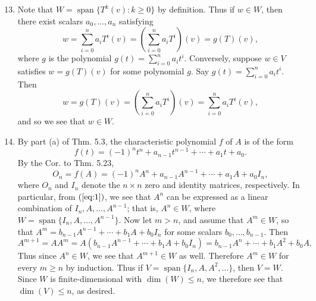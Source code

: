\documentclass[12pt]{article}
\DeclareMathOperator{\spn}{span}
\begin{document}
\begin{enumerate}
\setcounter{enumi}{12}
\item
Note that $W = \spn\{T^k(v) : k \geq 0\}$ by definition. Thus if $w \in W$, then there exist scalars $a_0, \dots, a_n$ satisfying
\begin{equation*}
w = \sum_{i=0}^n a_i T^i(v) = \left(\sum_{i=0}^n a_i T^i \right)(v) = g(T)(v),
\end{equation*}
where $g$ is the polynomial $g(t) = \sum_{i=0}^n a_i t^i$. Conversely, suppose $w \in V$ satisfies $w = g(T)(v)$ for some polynomial $g$. Say $g(t) = \sum_{i=0}^n a_i t^i$. Then
\begin{equation*}
w = g(T)(v) = \left(\sum_{i=0}^n a_i T^i \right)(v) = \sum_{i=0}^n a_i T^i(v),
\end{equation*}
and so we see that $w \in W$.

\setcounter{enumi}{16}
\item
By part (a) of Thm. 5.3, the characteristic polynomial $f$ of $A$ is of the form
\begin{equation*}
f(t) = (-1)^n t^n + a_{n-1} t^{n-1} + \cdots + a_1 t + a_0.
\end{equation*}
By the Cor. to Thm. 5.23,
\begin{equation} \label{eq:1}
O_n = f(A) = (-1)^n A^n + a_{n-1} A^{n-1} + \cdots + a_1 A + a_0 I_n,
\end{equation}
where $O_n$ and $I_n$ denote the $n \times n$ zero and identity matrices, respectively. In particular, from $(\ref{eq:1})$, we see that $A^n$ can be expressed as a linear combination of $I_n, A, \dots, A^{n-1}$; that is, $A^n \in W$, where $W = \spn\{I_n, A, \dots, A^{n-1}\}$. Now let $m > n$, and assume that $A^m \in W$, so that $A^m = b_{n-1}A^{n-1} + \cdots + b_1 A + b_0 I_n$ for some scalars $b_0, \dots, b_{n-1}$. Then
\begin{equation*}
A^{m+1} = A A^m = A(b_{n-1}A^{n-1} + \cdots + b_1 A + b_0 I_n) = b_{n-1}A^{n} + \cdots + b_1 A^2 + b_0 A.
\end{equation*}
Thus since $A^n \in W$, we see that $A^{m+1} \in W$ as well. Therefore $A^m \in W$ for every $m \geq n$ by induction. Thus if $V = \spn\{I_n, A, A^2, \dots\}$, then $V = W$. Since $W$ is finite-dimensional with $\dim(W) \leq n$, we therefore see that $\dim(V) \leq n$, as desired.


\end{enumerate}
\end{document}
